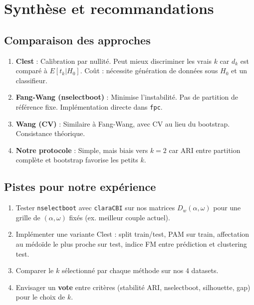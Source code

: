 \documentclass[11pt, a4paper]{article}
\begin{document}
\section{Synthèse et recommandations}

\subsection{Comparaison des approches}

\begin{enumerate}
  \item \textbf{Clest} : Calibration par nullité. Peut mieux discriminer les vrais $k$ car $d_k$ est comparé à $E[t_k | H_0]$. Coût : nécessite génération de données sous $H_0$ et un classifieur.
  \item \textbf{Fang-Wang (nselectboot)} : Minimise l'instabilité. Pas de partition de référence fixe. Implémentation directe dans \texttt{fpc}.
  \item \textbf{Wang (CV)} : Similaire à Fang-Wang, avec CV au lieu du bootstrap. Consistance théorique.
  \item \textbf{Notre protocole} : Simple, mais biais vers $k=2$ car ARI entre partition complète et bootstrap favorise les petits $k$.
\end{enumerate}

\subsection{Pistes pour notre expérience}

\begin{enumerate}
  \item Tester \texttt{nselectboot} avec \texttt{claraCBI} sur nos matrices $D_w(\alpha, \omega)$ pour une grille de $(\alpha, \omega)$ fixés (ex. meilleur couple actuel).
  \item Implémenter une variante Clest : split train/test, PAM sur train, affectation au médoïde le plus proche sur test, indice FM entre prédiction et clustering test.
  \item Comparer le $k$ sélectionné par chaque méthode sur nos 4 datasets.
  \item Envisager un \textbf{vote} entre critères (stabilité ARI, nselectboot, silhouette, gap) pour le choix de $k$.
\end{enumerate}
\end{document}
